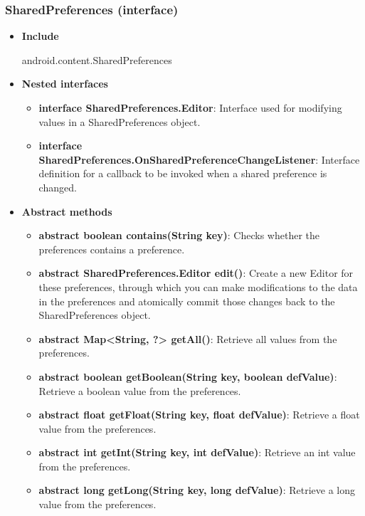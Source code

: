 \documentclass{report}
\begin{document}
    \subsubsection{SharedPreferences (interface)}
    \begin{itemize}
        \item \textbf{Include}
            \bigbreak \noindent 
            \begin{javacode}
                android.content.SharedPreferences
            \end{javacode}
        \item \textbf{Nested interfaces}
            \begin{itemize}
                \item \textbf{interface	SharedPreferences.Editor}: Interface used for modifying values in a SharedPreferences object. 
                \item \textbf{interface	SharedPreferences.OnSharedPreferenceChangeListener}: Interface definition for a callback to be invoked when a shared preference is changed. 
            \end{itemize}
        \item \textbf{Abstract methods}
            \begin{itemize}
                \item \textbf{abstract boolean	contains(String key)}: Checks whether the preferences contains a preference.
                \item \textbf{abstract SharedPreferences.Editor	edit()}: Create a new Editor for these preferences, through which you can make modifications to the data in the preferences and atomically commit those changes back to the SharedPreferences object.
                \item \textbf{abstract Map<String, ?>	getAll()}: Retrieve all values from the preferences.
                \item \textbf{abstract boolean	getBoolean(String key, boolean defValue)}: Retrieve a boolean value from the preferences.
                \item \textbf{abstract float	getFloat(String key, float defValue)}: Retrieve a float value from the preferences.
                \item \textbf{abstract int	getInt(String key, int defValue)}: Retrieve an int value from the preferences.
                \item \textbf{abstract long	getLong(String key, long defValue)}: Retrieve a long value from the preferences.

\end{itemize}
\end{itemize}
\end{document}
